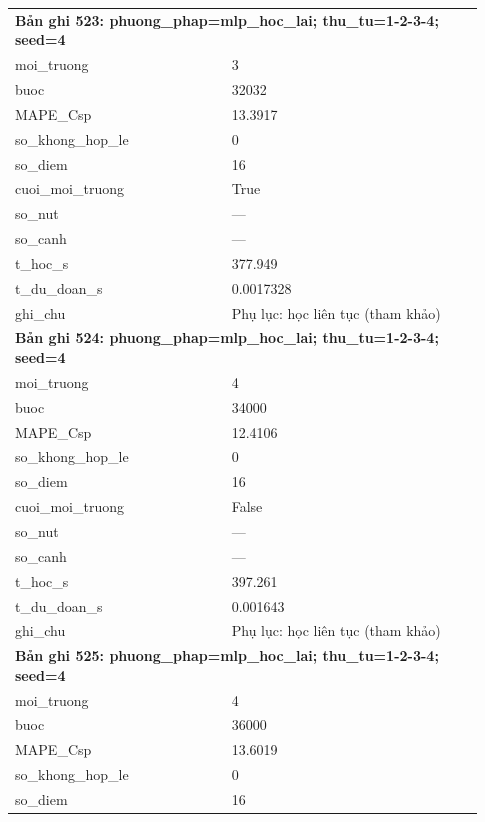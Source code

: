 \begin{longtable}{p{0.43\linewidth}p{0.50\linewidth}}
\midrule
\multicolumn{2}{p{0.95\linewidth}}{\textbf{Bản ghi 523: phuong\_phap=mlp\_hoc\_lai; thu\_tu=1-2-3-4; seed=4}} \\
moi\_\allowbreak truong & 3 \\
buoc & 32032 \\
MAPE\_\allowbreak Csp & 13.3917 \\
so\_\allowbreak khong\_\allowbreak hop\_\allowbreak le & 0 \\
so\_\allowbreak diem & 16 \\
cuoi\_\allowbreak moi\_\allowbreak truong & True \\
so\_\allowbreak nut & — \\
so\_\allowbreak canh & — \\
t\_\allowbreak hoc\_\allowbreak s & 377.949 \\
t\_\allowbreak du\_\allowbreak doan\_\allowbreak s & 0.0017328 \\
ghi\_\allowbreak chu & Phụ lục: học liên tục (tham khảo) \\
\midrule
\multicolumn{2}{p{0.95\linewidth}}{\textbf{Bản ghi 524: phuong\_phap=mlp\_hoc\_lai; thu\_tu=1-2-3-4; seed=4}} \\
moi\_\allowbreak truong & 4 \\
buoc & 34000 \\
MAPE\_\allowbreak Csp & 12.4106 \\
so\_\allowbreak khong\_\allowbreak hop\_\allowbreak le & 0 \\
so\_\allowbreak diem & 16 \\
cuoi\_\allowbreak moi\_\allowbreak truong & False \\
so\_\allowbreak nut & — \\
so\_\allowbreak canh & — \\
t\_\allowbreak hoc\_\allowbreak s & 397.261 \\
t\_\allowbreak du\_\allowbreak doan\_\allowbreak s & 0.001643 \\
ghi\_\allowbreak chu & Phụ lục: học liên tục (tham khảo) \\
\midrule
\multicolumn{2}{p{0.95\linewidth}}{\textbf{Bản ghi 525: phuong\_phap=mlp\_hoc\_lai; thu\_tu=1-2-3-4; seed=4}} \\
moi\_\allowbreak truong & 4 \\
buoc & 36000 \\
MAPE\_\allowbreak Csp & 13.6019 \\
so\_\allowbreak khong\_\allowbreak hop\_\allowbreak le & 0 \\
so\_\allowbreak diem & 16 \\

\end{longtable}
